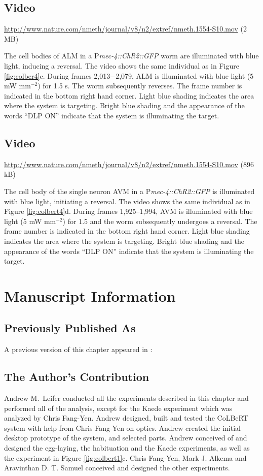 \subsection{Video}\label{movie:colbert8} %
\url{http://www.nature.com/nmeth/journal/v8/n2/extref/nmeth.1554-S10.mov} (2 MB)

The cell bodies of ALM in a P\textit{mec-4::ChR2::GFP} worm are illuminated with blue light, inducing a reversal. The video shows the same individual as in Figure \ref{fig:colber4}c. During frames 2,013−2,079, ALM is illuminated with blue light (5 mW mm$^{−2}$) for 1.5 s. The worm subsequently reverses. The frame number is indicated in the bottom right hand corner. Light blue shading indicates the area where the system is targeting. Bright blue shading and the appearance of the words “DLP ON” indicate that the system is illuminating the target.

\subsection{Video}\label{movie:colbert9} %
\url{http://www.nature.com/nmeth/journal/v8/n2/extref/nmeth.1554-S10.mov} (896 kB)

The cell body of the single neuron AVM in a P\textit{mec-4::ChR2::GFP} is illuminated with blue light, initiating a reversal. The video shows the same individual as in Figure \ref{fig:colbert4}d. During frames 1,925–1,994, AVM is illuminated with blue light (5 mW mm$^{−2}$) for 1.5 and the worm subsequently undergoes a reversal. The frame number is indicated in the bottom right hand corner. Light blue shading indicates the area where the system is targeting. Bright blue shading and the appearance of the words “DLP ON” indicate that the system is illuminating the target.


\section{Manuscript Information}
\subsection{Previously Published As}
A previous version of this chapter appeared in \citep{leifer_optogenetic_2011}:


\subsection{The Author's Contribution}
Andrew M.~Leifer conducted all the experiments described in this chapter and performed all of the analysis, except for the Kaede experiment which was analyzed by Chris Fang-Yen. Andrew designed, built and tested the CoLBeRT system with help from Chris Fang-Yen on optics.  Andrew created the initial desktop prototype of the system, and selected parts.  Andrew conceived of and designed the egg-laying, the habituation and the Kaede experiments, as well as the experiment in Figure \ref{fig:colbert1}c.    Chris Fang-Yen, Mark J. Alkema and Aravinthan D. T. Samuel conceived and designed the other experiments. 

